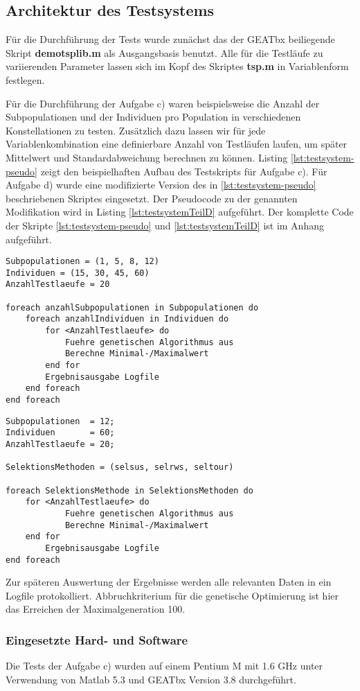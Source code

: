 \subsection{Architektur des Testsystems}
\label{subsec:ArchitekturTestsystem}
Für die Durchführung der Tests wurde zunächst das der GEATbx beiliegende Skript
\textbf{demotsplib.m} als Ausgangsbasis benutzt. Alle für die Testläufe zu
variierenden Parameter lassen sich im Kopf des Skriptes \textbf{tsp.m} in
Variablenform festlegen. 

Für die Durchführung der Aufgabe c) waren beispielsweise die Anzahl der
Subpopulationen und der Individuen pro Population in verschiedenen
Konstellationen zu testen. Zusätzlich dazu lassen wir für jede
Variablenkombination eine definierbare Anzahl von Testläufen laufen, um später
Mittelwert und Standardabweichung berechnen zu können. Listing
\ref{lst:testsystem-pseudo} zeigt den beispielhaften Aufbau des Testskripts für
Aufgabe c). Für Aufgabe d) wurde eine modifizierte Version des in
\ref{lst:testsystem-pseudo} beschriebenen Skriptes eingesetzt. Der Pseudocode
zu der genannten Modifikation wird in Listing \ref{lst:testsystemTeilD}
aufgeführt. Der komplette Code der Skripte \ref{lst:testsystem-pseudo} und
\ref{lst:testsystemTeilD} ist im Anhang aufgeführt.

\begin{lstlisting}[language=Pseudo, label={lst:testsystem-pseudo}, 
caption={Pseudocode Testskript Teil B}]
Subpopulationen = (1, 5, 8, 12)
Individuen = (15, 30, 45, 60)
AnzahlTestlaeufe = 20

foreach anzahlSubpopulationen in Subpopulationen do
	foreach anzahlIndividuen in Individuen do
		for <AnzahlTestlaeufe> do
			Fuehre genetischen Algorithmus aus
			Berechne Minimal-/Maximalwert
		end for
		Ergebnisausgabe Logfile
	end foreach
end foreach
\end{lstlisting}

\begin{lstlisting}[language=Pseudo, label={lst:testsystemTeilD}, 
caption={Pseudocode Testskript Teil D}]
Subpopulationen  = 12;
Individuen 	     = 60;
AnzahlTestlaeufe = 20;

SelektionsMethoden = (selsus, selrws, seltour)

foreach SelektionsMethode in SelektionsMethoden do
	for <AnzahlTestlaeufe> do
			Fuehre genetischen Algorithmus aus
			Berechne Minimal-/Maximalwert
	end for
		Ergebnisausgabe Logfile
end foreach
\end{lstlisting}

Zur späteren Auswertung der Ergebnisse werden alle relevanten Daten in ein
Logfile protokolliert. Abbruchkriterium für die genetische Optimierung ist hier
das Erreichen der Maximalgeneration 100.

\subsubsection{Eingesetzte Hard- und Software}
Die Tests der Aufgabe c) wurden auf einem Pentium M mit 1.6 GHz unter 
Verwendung von Matlab 5.3 und GEATbx Version 3.8 durchgeführt.